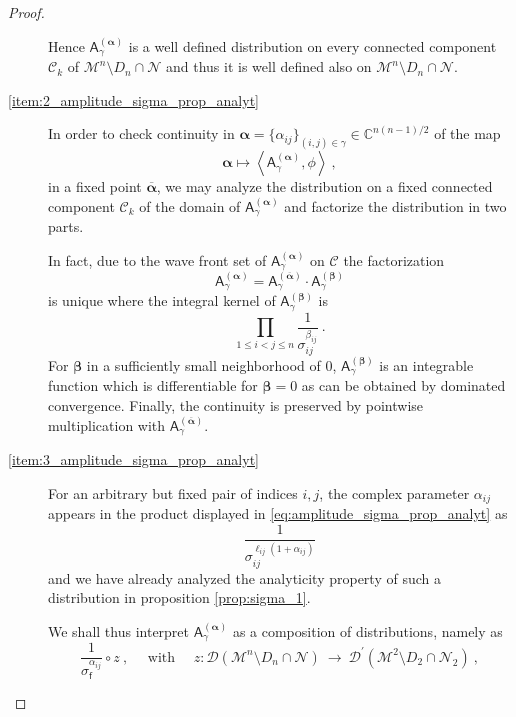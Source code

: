 \documentclass[11pt]{book}
\newcommand{\alphabd}{\boldsymbol{\alpha}}
\newcommand{\betabd}{\boldsymbol{\beta}}
\newcommand{\sm}[1]{\left\langle#1\right\rangle}
\newcommand{\Ccal}{\mathcal{C}}
\newcommand{\Dcal}{\mathcal{D}}
\newcommand{\Mcal}{\mathcal{M}}
\newcommand{\Ncal}{\mathcal{N}}
\newcommand{\Cbb}{\mathbb{C}}
\newcommand{\Asf}{\mathsf{A}}
\newcommand{\fsf}{\mathsf{f}}
\theoremstyle{break}
\begin{document}
\begin{proof}
\begin{description}
%
Hence $\Asf_\gamma^{(\alphabd)}$ is a well defined distribution on every connected component $\Ccal_k$ of $\Mcal^n\setminus D_n\cap \Ncal$ and thus it is well defined also on $\Mcal^n\setminus D_n\cap \Ncal$. 
%
%
\item[\ref{item:2_amplitude_sigma_prop_analyt}] In order to check continuity in $\alphabd = \{\alpha_{ij}\}_{(i,j)\in\gamma} \in \Cbb^{n(n-1)/2}$ of the map
%
\begin{equation*}
\alphabd \mapsto \sm{ \Asf_\gamma^{(\alphabd)} , \phi } \ ,
\end{equation*}
%
in a fixed point $\overline{\alphabd}$, we may analyze the distribution on a fixed connected component $\Ccal_k$ of the domain of $\Asf_\gamma^{(\alphabd)}$ and factorize the distribution in two parts.\par%
%
In fact, due to the wave front set of $\Asf_\gamma^{(\alphabd)}$ on $\mathcal{C}$ the factorization 
%
\begin{equation*}
\Asf_\gamma^{(\alphabd)} = \Asf_\gamma^{(\overline{\alphabd})} \cdot \Asf_\gamma^{(\betabd)} 
\end{equation*}
%
is unique where the integral kernel of $\Asf_\gamma^{(\betabd)}$ is
%
\begin{equation*}
\prod_{1\leq i < j \leq n } \frac{1}{\sigma_{ij}^{\beta_{ij}}} \ .
\end{equation*}
%
For $\betabd$ in a sufficiently small neighborhood of $0$, $\Asf_\gamma^{(\betabd)}$ is an integrable function which is differentiable for $\betabd=0$ as can be obtained by dominated convergence. Finally, the continuity is preserved by pointwise multiplication with $\Asf_\gamma^{(\overline{\alphabd})}$.
%
%
\item[\ref{item:3_amplitude_sigma_prop_analyt}]
For an arbitrary but fixed pair of indices $i,j$, the complex parameter $\alpha_{ij}$ appears in the product displayed in \eqref{eq:amplitude_sigma_prop_analyt} as 
%
\begin{equation*}
\frac{1}{\sigma_{ij}^{\ell_{ij}(1+\alpha_{ij})}} 
\end{equation*}
%
and we have already analyzed the analyticity property of such a distribution in proposition \ref{prop:sigma_1}.\par 
We shall thus interpret $\Asf_\gamma^{(\alphabd)}$ as a composition of distributions, namely as 
%
\begin{equation*}
\frac{1}{\sigma_\fsf^{\alpha_{ij}}} \circ z \ , \quad \mbox{ with } \quad z : \Dcal(\Mcal^{n}\setminus D_{n}\cap \Ncal) \ \to \ \Dcal^\prime(\Mcal^{2}\setminus D_2\cap \Ncal_2) \ ,

\end{equation*}
\end{description}
\end{proof}
\end{document}
